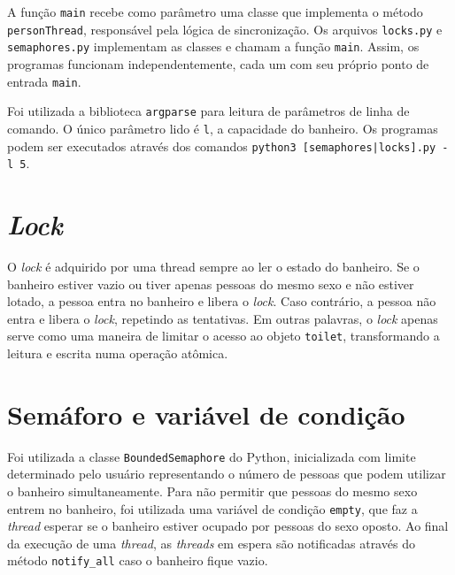 \documentclass[12pt, a4paper]{article}
\newcommand{\code}[1]{{\lstinline{#1}}}
\begin{document}
A função \code{main} recebe como parâmetro uma classe que implementa o método
\code{personThread}, responsável pela lógica de sincronização. Os arquivos
\code{locks.py} e \code{semaphores.py} implementam as classes e chamam a função
\code{main}. Assim, os programas funcionam independentemente, cada um com seu
próprio ponto de entrada \code{main}. 

Foi utilizada a biblioteca \code{argparse} para leitura de parâmetros de linha
de comando. O único parâmetro lido é \code{l}, a capacidade do banheiro. Os
programas podem ser executados através dos comandos \code{python3
[semaphores|locks].py -l 5}.

\section{\emph{Lock}}
O \emph{lock} é adquirido por uma thread sempre ao ler o estado do banheiro. Se
o banheiro estiver vazio ou tiver apenas pessoas do mesmo sexo e não estiver
lotado, a pessoa entra no banheiro e libera o \emph{lock}. Caso contrário, a
pessoa não entra e libera o \emph{lock}, repetindo as tentativas. Em outras
palavras, o \emph{lock} apenas serve como uma maneira de limitar o acesso ao
objeto \code{toilet}, transformando a leitura e escrita numa operação atômica.

\section{Semáforo e variável de condição}
Foi utilizada a classe \code{BoundedSemaphore} do Python, inicializada com
limite determinado pelo usuário representando o número de pessoas que podem
utilizar o banheiro simultaneamente. Para não permitir que pessoas do mesmo
sexo entrem no banheiro, foi utilizada uma variável de condição \code{empty},
que faz a \emph{thread} esperar se o banheiro estiver ocupado por pessoas do
sexo oposto. Ao final da execução de uma \emph{thread}, as \emph{threads} em
espera são notificadas através do método \code{notify_all} caso o banheiro
fique vazio.
\end{document}
